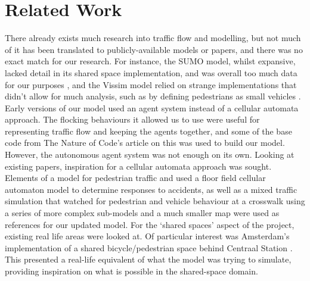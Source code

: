 \chapter{Related Work} \label{chap:related}

There already exists much research into traffic flow and modelling, but not much of it has been translated to publicly-available models or papers, and there was no exact match for our research. For instance, the SUMO model, whilst expansive, lacked detail in its shared space implementation, and was overall too much data for our purposes \cite{krajzewicz2014}, and the Vissim model relied on strange implementations that didn’t allow for much analysis, such as by defining pedestrians as small vehicles \cite{kupferschmid2016}.
Early versions of our model used an agent system instead of a cellular automata approach. The flocking behaviours it allowed us to use were useful for representing traffic flow and keeping the agents together, and some of the base code from The Nature of Code's article on this \cite{shiffman2012} was used to build our model. However, the autonomous agent system was not enough on its own. Looking at existing papers, inspiration for a cellular automata approach was sought. Elements of a model for pedestrian traffic \cite{min2017} and used a floor field cellular automaton model to determine responses to accidents, as well as a mixed traffic simulation that watched for pedestrian and vehicle behaviour at a crosswalk using a series of more complex sub-models and a much smaller map \cite{zhang2007} were used as references for our updated model.
For the ‘shared spaces’ aspect of the project, existing real life areas were looked at. Of particular interest was Amsterdam's implementation of a shared bicycle/pedestrian space behind Centraal Station \cite{kruyswijk2016}. This presented a real-life equivalent of what the model was trying to simulate, providing inspiration on what is possible in the shared-space domain.
